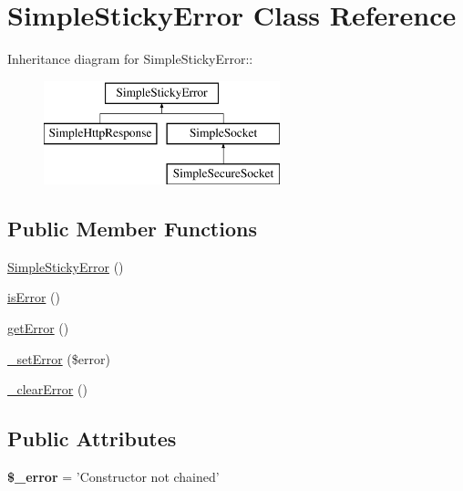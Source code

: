 \hypertarget{class_simple_sticky_error}{
\section{SimpleStickyError Class Reference}
\label{class_simple_sticky_error}
}
Inheritance diagram for SimpleStickyError::\begin{figure}[H]
\begin{center}
\leavevmode
\includegraphics[height=3cm]{class_simple_sticky_error}
\end{center}
\end{figure}
\subsection*{Public Member Functions}
\begin{DoxyCompactItemize}
\item 
\hyperlink{class_simple_sticky_error_aedb79c147da7f14e9ec87f9a4059d30c}{SimpleStickyError} ()
\item 
\hyperlink{class_simple_sticky_error_a37e83b42c631c9650c2920913d0b0bc3}{isError} ()
\item 
\hyperlink{class_simple_sticky_error_a377b1930966cc852d9572445485a7471}{getError} ()
\item 
\hyperlink{class_simple_sticky_error_abbb02ba21c518eacef14ad26dbd07147}{\_\-setError} (\$error)
\item 
\hyperlink{class_simple_sticky_error_aeb95775c3c9b3a66a3292838a86c6bbc}{\_\-clearError} ()
\end{DoxyCompactItemize}
\subsection*{Public Attributes}
\begin{DoxyCompactItemize}
\item 
\hypertarget{class_simple_sticky_error_ab5f008ca03ebcf3e293e9924412dbc6a}{
{\bfseries \$\_\-error} = 'Constructor not chained'}
\label{class_simple_sticky_error_ab5f008ca03ebcf3e293e9924412dbc6a}

\end{DoxyCompactItemize}


